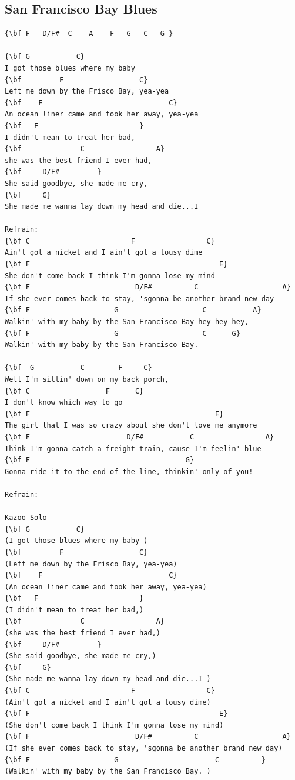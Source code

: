 \documentclass[a4paper]{article}
\begin{document}
\subsection{San Francisco Bay Blues}
\begin{Verbatim}[commandchars=\\\{\}]
{\bf F   D/F#  C    A    F   G   C   G }

{\bf G           C}
I got those blues where my baby 
{\bf         F                  C}
Left me down by the Frisco Bay, yea-yea
{\bf    F                              C}
An ocean liner came and took her away, yea-yea
{\bf   F                        }
I didn't mean to treat her bad,
{\bf              C                 A}
she was the best friend I ever had,
{\bf     D/F#         }
She said goodbye, she made me cry,
{\bf     G}
She made me wanna lay down my head and die...I 

Refrain:
{\bf C                        F                 C}
Ain't got a nickel and I ain't got a lousy dime
{\bf F                                             E}
She don't come back I think I'm gonna lose my mind
{\bf F                         D/F#          C                    A}
If she ever comes back to stay, 'sgonna be another brand new day
{\bf F                    G                    C           A}
Walkin' with my baby by the San Francisco Bay hey hey hey,
{\bf F                    G                    C      G}
Walkin' with my baby by the San Francisco Bay. 

{\bf  G           C        F     C}
Well I'm sittin' down on my back porch, 
{\bf C                  F      C}
I don't know which way to go
{\bf F                                            E}
The girl that I was so crazy about she don't love me anymore
{\bf F                       D/F#           C                 A}
Think I'm gonna catch a freight train, cause I'm feelin' blue
{\bf F                                     G}
Gonna ride it to the end of the line, thinkin' only of you! 

Refrain:

Kazoo-Solo
{\bf G           C}
(I got those blues where my baby )
{\bf         F                  C}
(Left me down by the Frisco Bay, yea-yea)
{\bf    F                              C}
(An ocean liner came and took her away, yea-yea)
{\bf   F                        }
(I didn't mean to treat her bad,)
{\bf              C                 A}
(she was the best friend I ever had,)
{\bf     D/F#         }
(She said goodbye, she made me cry,)
{\bf     G}
(She made me wanna lay down my head and die...I )
{\bf C                        F                 C}
(Ain't got a nickel and I ain't got a lousy dime)
{\bf F                                             E}
(She don't come back I think I'm gonna lose my mind)
{\bf F                         D/F#          C                    A}
(If she ever comes back to stay, 'sgonna be another brand new day)
{\bf F                    G                       C          }
(Walkin' with my baby by the San Francisco Bay. )



\end{Verbatim}
\end{document}
